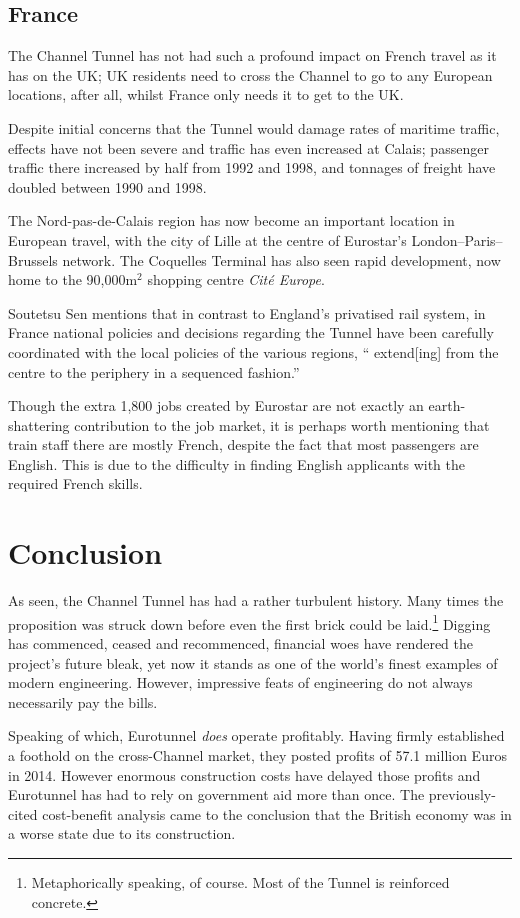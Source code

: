 \documentclass[12pt]{article} %
\begin{document}
\subsection{France}
The Channel Tunnel has not had such a profound impact on French travel as it has on the UK; UK residents need to cross the Channel to go to any European locations, after all, whilst France only needs it to get to the UK.

Despite initial concerns that the Tunnel would damage rates of maritime traffic, effects have not been severe and traffic has even increased at Calais; passenger traffic there increased by half from 1992 and 1998, and tonnages of freight have doubled between 1990 and 1998.\cite{manche}

The Nord-pas-de-Calais region has now become an important location in European travel, with the city of Lille at the centre of Eurostar's London--Paris--Brussels network. The Coquelles Terminal has also seen rapid development, now home to the 90,000m$^2$ shopping centre \emph{Cité Europe}.

Soutetsu Sen mentions that in contrast to England's privatised rail system, in France national policies and decisions regarding the Tunnel have been carefully coordinated with the local policies of the various regions, `` extend[ing] from the centre to the periphery
in a sequenced fashion.''

Though the extra 1,800 jobs created by Eurostar are not exactly an earth-shattering contribution to the job market, it is perhaps worth mentioning that train staff there are mostly French, despite the fact that most passengers are English. This is due to the difficulty in finding English applicants with the required French skills.

\section{Conclusion}
As seen, the Channel Tunnel has had a rather turbulent history. Many times the proposition was struck down before even the first brick could be laid.\footnote{Metaphorically speaking, of course. Most of the Tunnel is reinforced concrete.} Digging has commenced, ceased and recommenced, financial woes have rendered the project's future bleak, yet now it stands as one of the world's finest examples of modern engineering. However, impressive feats of engineering do not always necessarily pay the bills.

Speaking of which, Eurotunnel \emph{does} operate profitably. Having firmly established a foothold on the cross-Channel market, they posted profits of 57.1 million Euros in 2014. However enormous construction costs have delayed those profits and Eurotunnel has had to rely on government aid more than once. The previously-cited cost-benefit analysis came to the conclusion that the British economy was in a worse state due to its construction.\cite{costeval}
\end{document}
